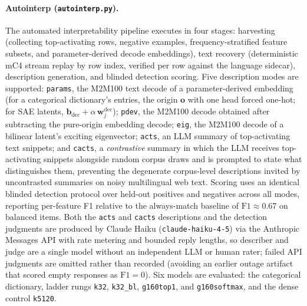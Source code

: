 \paragraph{Autointerp (\texttt{autointerp.py}).}
The automated interpretability pipeline executes in four stages: harvesting
(collecting top-activating rows, negative examples, frequency-stratified
feature subsets, and parameter-derived decode embeddings), text recovery
(deterministic mC4 stream replay by row index, verified per row against the
language sidecar), description generation, and blinded detection scoring.
Five description modes are supported: \texttt{params}, the M2M100 text
decode of a parameter-derived embedding (for a categorical dictionary's
entries, the origin $\mathbf{o}$ with one head forced one-hot; for SAE latents,
$\mathbf{b}_{\mathrm{dec}} + \alpha\,\mathbf{w}^{\mathrm{dec}}_j$);
\texttt{pdev}, the M2M100 decode obtained after subtracting the pure-origin
embedding decode; \texttt{eig}, the M2M100 decode of a bilinear latent's
exciting eigenvector; \texttt{acts}, an LLM summary of top-activating text
snippets; and \texttt{cacts}, a \emph{contrastive} summary in which the LLM
receives top-activating snippets alongside random corpus draws and is
prompted to state what distinguishes them, preventing the degenerate
corpus-level descriptions invited by uncontrasted summaries on noisy
multilingual web text. Scoring uses an identical blinded detection protocol
over held-out positives and negatives across all modes, reporting
per-feature F1 relative to the always-match baseline of
$\mathrm{F1} \approx 0.67$ on balanced items. Both the \texttt{acts} and
\texttt{cacts} descriptions and the detection judgments are produced by
Claude Haiku (\texttt{claude-haiku-4-5}) via the Anthropic Messages API
with rate metering and bounded reply lengths, so describer and judge are a
single model without an independent LLM or human rater; failed API
judgments are omitted rather than recorded (avoiding an earlier outage
artifact that scored empty responses as $\mathrm{F1}=0$). Six models are
evaluated: the categorical dictionary, ladder rungs \texttt{k32},
\texttt{k32\_bl}, \texttt{g160top1}, and \texttt{g160softmax}, and the
dense control \texttt{k5120}.

